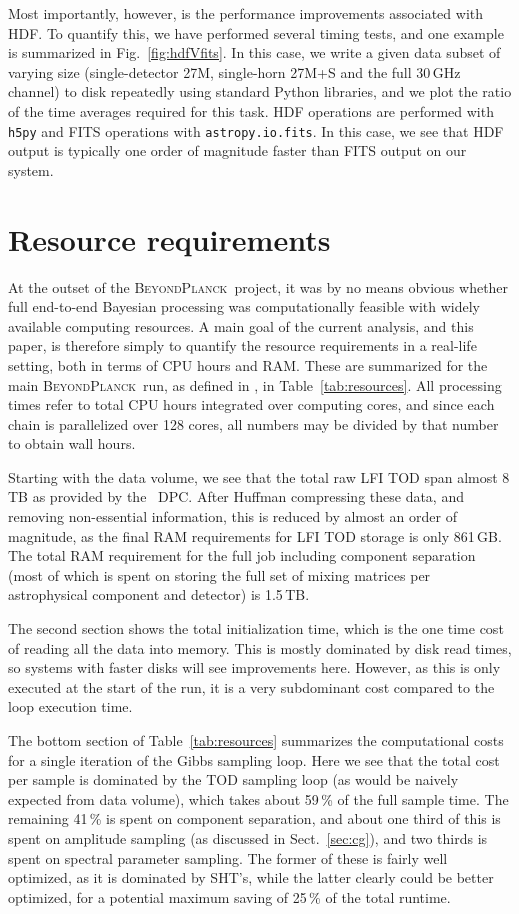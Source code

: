 \documentclass[twocolumn]{aa}
\newcommand{\BP}{\textsc{BeyondPlanck}}
\begin{document}
Most importantly, however, is the performance improvements associated
with HDF. To quantify this, we have performed several timing tests,
and one example is summarized in Fig.~\ref{fig:hdfVfits}. In this
case, we write a given data subset of varying size (single-detector
27M, single-horn 27M+S and the full 30\,GHz channel) to disk
repeatedly using standard Python libraries, and we plot the ratio of
the time averages required for this task. HDF operations are performed
with \texttt{h5py} and FITS operations with
\texttt{astropy.io.fits}. In this case, we see that HDF output is
typically one order of magnitude faster than FITS output on our
system.

\section{Resource requirements}

At the outset of the \BP\ project, it was by no means obvious whether
full end-to-end Bayesian processing was computationally feasible with
widely available computing resources. A main goal of the current
analysis, and this paper, is therefore simply to quantify the resource
requirements in a real-life setting, both in terms of CPU hours and
RAM. These are summarized for the main \BP\ run, as defined in
\citet{BP01}, in Table~\ref{tab:resources}. All processing times refer
to total CPU hours integrated over computing cores, and since each
chain is parallelized over 128 cores, all numbers may be divided by
that number to obtain wall hours.

Starting with the data volume, we see that the total raw LFI TOD span
almost 8\,TB as provided by the \Planck\ DPC. After Huffman
compressing these data, and removing non-essential information, this
is reduced by almost an order of magnitude, as the final RAM
requirements for LFI TOD storage is only 861\,GB. The total RAM
requirement for the full job including component separation (most of
which is spent on storing the full set of mixing matrices per
astrophysical component and detector) is 1.5\,TB.

The second section shows the total initialization time, which is the
one time cost of reading all the data into memory. This is mostly
dominated by disk read times, so systems with faster disks will see
improvements here. However, as this is only executed at the start of
the run, it is a very subdominant cost compared to the loop execution
time.

The bottom section of Table~\ref{tab:resources} summarizes the
computational costs for a single iteration of the Gibbs sampling
loop. Here we see that the total cost per sample is dominated by the
TOD sampling loop (as would be naively expected from data volume),
which takes about 59\,\% of the full sample time. The remaining 41\,\%
is spent on component separation, and about one third of this is spent
on amplitude sampling (as discussed in Sect.~\ref{sec:cg}), and two
thirds is spent on spectral parameter sampling. The former of these is
fairly well optimized, as it is dominated by SHT's, while the latter
clearly could be better optimized, for a potential maximum saving of
25\,\% of the total runtime. 
\end{document}
